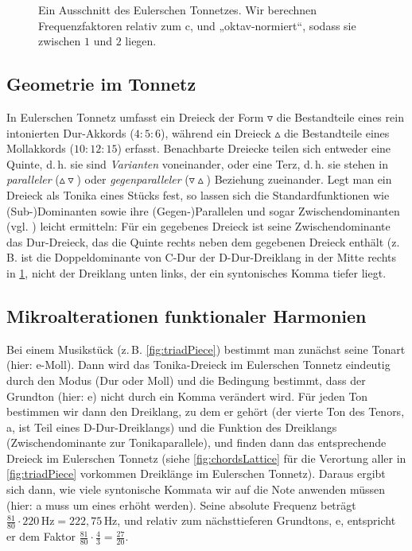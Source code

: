 \begin{figure}[h]
  
  \caption{Ein Ausschnitt des Eulerschen Tonnetzes. Wir berechnen
    Frequenzfaktoren relativ zum c, und „oktav-normiert“, sodass sie zwischen
    $1$ und $2$ liegen.}\label{fig:latticeExcerpt}
\end{figure}

\subsection{Geometrie im Tonnetz}

In Eulerschen Tonnetz umfasst ein Dreieck der Form $\triangledown$ die
Bestandteile eines rein intonierten Dur-Akkords ($4:5:6$), während ein Dreieck
$\vartriangle$ die Bestandteile eines Mollakkords ($10:12:15$)
erfasst. Benachbarte Dreiecke teilen sich entweder eine Quinte, d.\,h. sie sind
\emph{Varianten} voneinander, oder eine Terz, d.\,h. sie stehen in
\emph{paralleler} ($\vartriangle\!\!\!\triangledown$) oder
\emph{gegenparalleler} ($\triangledown\!\!\!\vartriangle$) Beziehung
zueinander. Legt man ein Dreieck als Tonika eines Stücks fest, so lassen sich
die Standardfunktionen wie \mbox{(Sub-)}Dominanten sowie ihre (Gegen-)Parallelen
und sogar Zwischendominanten (vgl. \cite[§\,10]{Skript}) leicht ermitteln: Für
ein gegebenes Dreieck ist seine Zwischendominante das Dur-Dreieck, das die
Quinte rechts neben dem gegebenen Dreieck enthält (z.\,B.  ist die
Doppeldominante von C-Dur der D-Dur-Dreiklang in der Mitte rechts in
\cref{fig:latticeExcerpt}, nicht der Dreiklang unten links, der ein syntonisches
Komma tiefer liegt.

\subsection{Mikroalterationen funktionaler Harmonien}

Bei einem Musikstück (z.\,B. \cref{fig:triadPiece}) bestimmt man zunächst seine
Tonart (hier: e-Moll). Dann wird das Tonika-Dreieck im Eulerschen Tonnetz
eindeutig durch den Modus (Dur oder Moll) und die Bedingung bestimmt, dass der
Grundton (hier: e) nicht durch ein Komma verändert wird. Für jeden Ton bestimmen
wir dann den Dreiklang, zu dem er gehört (der vierte Ton des Tenors, a, ist Teil
eines D-Dur-Dreiklangs) und die Funktion des Dreiklangs (Zwischendominante zur
Tonikaparallele), und finden dann das entsprechende Dreieck im Eulerschen
Tonnetz (siehe \cref{fig:chordsLattice} für die Verortung aller in
\cref{fig:triadPiece} vorkommen Dreiklänge im Eulerschen Tonnetz). Daraus ergibt
sich dann, wie viele syntonische Kommata wir auf die Note anwenden müssen (hier:
a muss um eines erhöht werden). Seine absolute Frequenz beträgt
$\frac{81}{80}\cdot 220\,\text{Hz}=222{,}75\,\text{Hz}$, und relativ zum
nächsttieferen Grundtons, e, entspricht er dem Faktor
$\frac{81}{80}\cdot\frac{4}{3}=\frac{27}{20}$.

